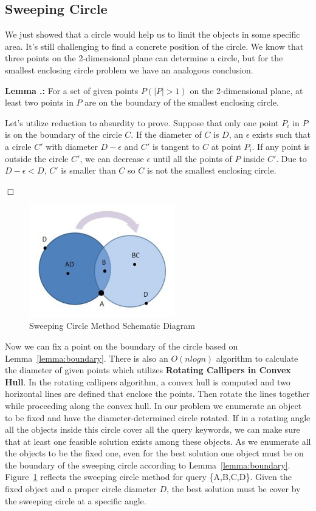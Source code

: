 \documentclass{sig-alternate}
\newcounter{theorem}[section]
\renewcommand{\thetheorem}{\nthesection.\arabic{theorem}}
\newenvironment{lemma}{\begin{em}
    \refstepcounter{theorem}
    {\vspace{1ex} \noindent\bf  Lemma  \thetheorem:}}{
    \end{em}\eop\vspace{1ex}} %
\newcommand{\nthesection}{\arabic{section}}
\newcommand{\eop}{\hspace*{\fill}\mbox{$\Box$}}
\begin{document}
\subsection{Sweeping Circle} \label{subsec:type2:sweeping}
We just showed that a circle would help us to limit the objects
in some specific area. It's still challenging to find a concrete
position of the circle. We know that three points on the 2-dimensional plane
can determine a circle, but for the smallest enclosing circle problem we
have an analogous conclusion.
%

\begin{lemma}\label{lemma:boundary}
For a set of given points $P(|P|>1)$ on the 2-dimensional plane,
at least two points in $P$ are on the boundary of the smallest enclosing circle.

\proof
Let's utilize reduction to absurdity to prove. Suppose that only one point 
$P_i$ in $P$ is on the boundary of the circle $C$. If the diameter of $C$
is $D$, an $\epsilon$ exists such that a circle $C'$ with diameter $D-\epsilon$
and $C'$ is tangent to $C$ at point $P_i$. If any point is outside the
circle $C'$, we can decrease $\epsilon$ until all the points of $P$ inside
$C'$. Due to $D-\epsilon < D$, $C'$ is smaller than $C$ so $C$ is not
the smallest enclosing circle.
\end{lemma}

\begin{figure}\label{fig:4}
\begin{center}
\includegraphics[width=2.5in]{figure/fig4}
\caption{Sweeping Circle Method Schematic Diagram}
\end{center}
\end{figure}

Now we can fix a point on the boundary of the circle based on Lemma~\ref{lemma:boundary}.
There is also an $O(nlogn)$ algorithm to calculate the diameter of given points 
which utilizes \textbf{Rotating Callipers in Convex Hull}. In the rotating callipers
algorithm, a convex hull is computed and two horizontal lines are defined
that enclose the points. Then rotate the lines together while proceeding along the
convex hull. In our problem we enumerate an object to be fixed and have the
diameter-determined circle rotated. If in a rotating angle all the objects inside
this circle cover all the query keywords, we can make sure that at least one feasible solution
exists among these objects. As we enumerate all the objects to be the fixed
one, even for the best solution one object must be on the boundary of the sweeping circle
according to Lemma~\ref{lemma:boundary}. Figure~\ref{fig:4} reflects the sweeping circle method
for query \{A,B,C,D\}.
Given the fixed object and a proper circle diameter $D$,
the best solution must be cover by the sweeping circle at a specific angle.
%
\end{document}

